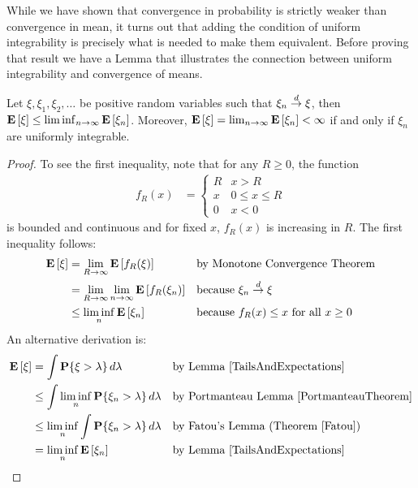 While we have shown that convergence in probability is strictly weaker
than convergence in mean, it turns out that adding the condition of
uniform integrability is precisely what is needed to make them
equivalent.  Before proving that result we have a Lemma that
illustrates the connection between uniform integrability and
convergence of means.
\begin{lem}\label{UniformIntegrableAndMeans}Let $\xi, \xi_1, \xi_2, \dotsc$ be positive random variables such
  that $\xi_n \overset{d}\to \xi$, then $\textbf{E}\left[\xi\right] \leq \liminf_{n \to
    \infty} \textbf{E}\left[\xi_n\right]$.  Moreover, $\textbf{E}\left[\xi\right] = \lim_{n \to
    \infty} \textbf{E}\left[\xi_n\right] < \infty$ if and only if $\xi_n$ are uniformly integrable.
\end{lem}
\begin{proof}
To see the first inequality, note that for any $R \geq 0$, the function
\begin{align*}
f_R(x) &= \begin{cases}
R & \text{$x > R$} \\
x & \text{$0 \leq x \leq R$} \\
0 & \text{$x < 0$}
\end{cases}
\end{align*}
 is bounded and continuous and for fixed $x$, $f_R(x)$ is increasing
 in $R$.  The first inequality follows:
\begin{align*}
\textbf{E}\left[\xi\right] &= \lim_{R \to \infty} \textbf{E}\left[f_R(\xi)\right] & &
\text{by Monotone Convergence Theorem} \\
&= \lim_{R \to \infty} \lim_{n \to \infty} \textbf{E}\left[f_R(\xi_n)\right]
& & \text{because $\xi_n \overset{d}\to \xi$}\\
&\leq \liminf_n \textbf{E}\left[\xi_n\right] & & \text{because $f_R(x) \leq x$
  for all $x \geq 0$}\\
\end{align*}
An alternative derivation is:
\begin{align*}
\textbf{E}\left[\xi\right] &= \int \textbf{P}\{\xi > \lambda\} \, d \lambda & &
\text{by Lemma \ref{TailsAndExpectations}}\\
&\leq \int \liminf_n \textbf{P}\{\xi_n > \lambda\} \, d\lambda & &
\text{by Portmanteau Lemma \ref{PortmanteauTheorem}} \\
&\leq \liminf_n \int \textbf{P}\{\xi_n > \lambda\} \, d\lambda & &
\text{by Fatou's Lemma (Theorem \ref{Fatou})} \\
&= \liminf_n \textbf{E}\left[\xi_n\right] & & \text{by Lemma \ref{TailsAndExpectations}}
\end{align*}


\end{proof}
